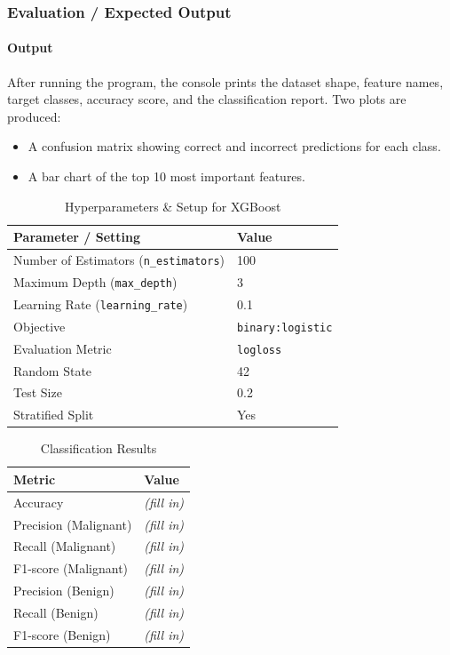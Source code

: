 \documentclass[a4paper,11pt]{article}
\begin{document}
\subsubsection{Evaluation / Expected Output}

\paragraph{Output}
After running the program, the console prints the dataset shape, feature names, target classes, accuracy score, and the classification report. Two plots are produced:
\begin{itemize}
    \item A confusion matrix showing correct and incorrect predictions for each class.
    \item A bar chart of the top 10 most important features.
\end{itemize}

\begin{table}[H]
\centering
\caption{Hyperparameters \& Setup for XGBoost}
\begin{tabular}{ll}
\toprule
\textbf{Parameter / Setting} & \textbf{Value} \\
\midrule
Number of Estimators (\texttt{n\_estimators}) & 100 \\
Maximum Depth (\texttt{max\_depth})           & 3 \\
Learning Rate (\texttt{learning\_rate})       & 0.1 \\
Objective                                      & \texttt{binary:logistic} \\
Evaluation Metric                              & \texttt{logloss} \\
Random State                                   & 42 \\
Test Size                                      & 0.2 \\
Stratified Split                               & Yes \\
\bottomrule
\end{tabular}
\end{table}

\begin{table}[H]
\centering
\caption{Classification Results}
\begin{tabular}{ll}
\toprule
\textbf{Metric} & \textbf{Value} \\
\midrule
Accuracy              & \textit{(fill in)} \\
Precision (Malignant) & \textit{(fill in)} \\
Recall (Malignant)    & \textit{(fill in)} \\
F1-score (Malignant)  & \textit{(fill in)} \\
Precision (Benign)    & \textit{(fill in)} \\
Recall (Benign)       & \textit{(fill in)} \\
F1-score (Benign)     & \textit{(fill in)} \\
\bottomrule
\end{tabular}
\end{table}
\end{document}
